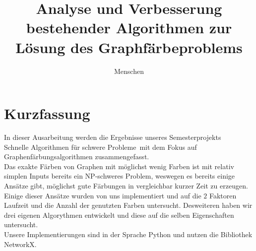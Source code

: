 \documentclass[11pt]{article}
\title{Analyse und Verbesserung bestehender Algorithmen zur Lösung des Graphfärbeproblems}
\author{Menschen} %
\begin{document}
\maketitle

\tableofcontents
\newpage

\section{Kurzfassung} %

In dieser Ausarbeitung werden die Ergebnisse unseres Semesterprojekts\\
\grqq Schnelle Algorithmen für schwere Probleme\grqq\ mit dem Fokus auf
Graphenfärbungsalgorithmen zusammengefasst. \\ 
Das exakte Färben von Graphen mit möglichst wenig Farben ist mit relativ simplen Inputs bereits ein NP-schweres Problem, weswegen es bereits einige Ansätze gibt,
möglichst gute Färbungen in vergleichbar kurzer Zeit zu erzeugen. Einige dieser Ansätze wurden von uns implementiert und auf die $2$ Faktoren 
Laufzeit und die Anzahl der genutzten Farben untersucht.
Desweiteren haben wir drei eigenen Algorythmen entwickelt und diese auf die selben Eigenschaften untersucht. \\
Unsere Implementierungen sind in der Sprache Python und nutzen die Bibliothek NetworkX.
\end{document}
